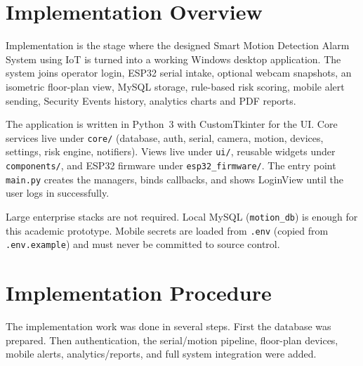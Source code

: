 \documentclass[12pt,a4paper]{report}
\begin{document}
\vfill
\null

\clearpage

\section{Implementation Overview}

Implementation is the stage where the designed Smart Motion Detection Alarm System using IoT is turned into a working Windows desktop application. The system joins operator login, ESP32 serial intake, optional webcam snapshots, an isometric floor-plan view, MySQL storage, rule-based risk scoring, mobile alert sending, Security Events history, analytics charts and PDF reports.

The application is written in Python~3 with CustomTkinter for the UI. Core services live under \texttt{core/} (database, auth, serial, camera, motion, devices, settings, risk engine, notifiers). Views live under \texttt{ui/}, reusable widgets under \texttt{components/}, and ESP32 firmware under \texttt{esp32\_firmware/}. The entry point \texttt{main.py} creates the managers, binds callbacks, and shows LoginView until the user logs in successfully.

Large enterprise stacks are not required. Local MySQL (\texttt{motion\_db}) is enough for this academic prototype. Mobile secrets are loaded from \texttt{.env} (copied from \texttt{.env.example}) and must never be committed to source control.

\section{Implementation Procedure}

The implementation work was done in several steps. First the database was prepared. Then authentication, the serial/motion pipeline, floor-plan devices, mobile alerts, analytics/reports, and full system integration were added.
\end{document}
